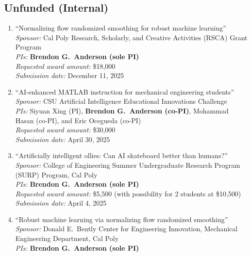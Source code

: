 \begin{grants}
\subsection{Unfunded (Internal)}
\begin{enumerate}[label={\arabic*.}]
	\item ``Normalizing flow randomized smoothing for robust machine learning'' \\
	\textit{Sponsor:} Cal Poly Research, Scholarly, and Creative Activities (RSCA) Grant Program \\
	\textit{PIs:} \textbf{Brendon G.\ Anderson (sole PI)} \\
	\textit{Requested award amount:} \$18,000 \\
	\textit{Submission date:} December 11, 2025 %
	\item ``AI-enhanced MATLAB instruction for mechanical engineering students'' \\
	\textit{Sponsor:} CSU Artificial Intelligence Educational Innovations Challenge \\
	\textit{PIs:} Siyuan Xing (PI), \textbf{Brendon G.\ Anderson (co-PI)}, Mohammad Hasan (co-PI), and Eric Ocegueda (co-PI) \\
	\textit{Requested award amount:} \$30,000 \\
	\textit{Submission date:} April 30, 2025 %
	\item ``Artificially intelligent ollies: Can AI skateboard better than humans?'' \\
	\textit{Sponsor:} College of Engineering Summer Undergraduate Research Program (SURP) Program, Cal Poly \\
	\textit{PIs:} \textbf{Brendon G.\ Anderson (sole PI)} \\
	\textit{Requested award amount:} \$5,500 (with possibility for 2 students at \$10,500) \\
	\textit{Submission date:} April 4, 2025 %
	\item ``Robust machine learning via normalizing flow randomized smoothing'' \\
	\textit{Sponsor:} Donald E.\ Bently Center for Engineering Innovation, Mechanical Engineering Department, Cal Poly \\
	\textit{PIs:} \textbf{Brendon G.\ Anderson (sole PI)} \\

\end{enumerate}
\end{grants}
